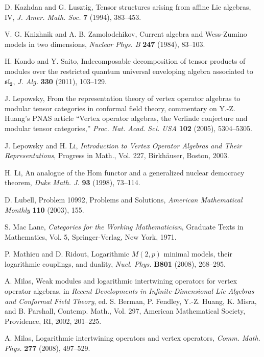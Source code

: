 \documentclass[12pt]{article}
\begin{document}
\begin{thebibliography}{FGST2}
D. Kazhdan and G. Lusztig,
Tensor structures arising {from} affine Lie algebras, IV,
{\em J. Amer. Math. Soc.} {\bf 7} (1994), 383--453.

V. G. Knizhnik and A. B. Zamolodchikov,
Current algebra and Wess-Zumino models in two dimensions,
{\em Nuclear Phys. B} {\bf 247} (1984), 83--103.

H. Kondo and Y. Saito, Indecomposable decomposition of tensor products
of modules over the restricted quantum universal enveloping algebra associated
to $\mathbf{\mathfrak{sl}_2}$, {\em J. Alg.} {\bf 330} (2011), 103--129.

 J. Lepowsky, {}From the representation theory of
vertex operator algebras to modular tensor categories in conformal
field theory, commentary on Y.-Z. Huang's PNAS article ``Vertex
operator algebras, the Verlinde conjecture and modular tensor
categories,'' {\it Proc. Nat. Acad. Sci. USA} {\bf 102} (2005),
5304--5305.

J. Lepowsky and H. Li, {\em Introduction to Vertex Operator Algebras
and Their Representations}, Progress in Math., Vol. 227, Birkh\"auser,
Boston, 2003.

H. Li, An analogue of the Hom functor and a generalized
nuclear democracy theorem, {\em Duke Math. J.} {\bf 93} (1998), 73--114.

 D. Lubell, Problem 10992, Problems and Solutions,
{\em American Mathematical Monthly} {\bf 110} (2003), 155.

 S. Mac Lane, {\it Categories for the Working
Mathematician}, Graduate Texts in Mathematics, Vol. 5,
Springer-Verlag, New York, 1971.

P. Mathieu and D. Ridout, Logarithmic $M(2,p)$ minimal models, their
logarithmic couplings, and duality, {\em Nucl. Phys.} {\bf B801}
(2008), 268--295.

 A. Milas, Weak modules and logarithmic intertwining
operators for vertex operator algebras, in {\em Recent Developments in
Infinite-Dimensional Lie Algebras and Conformal Field Theory},
ed. S. Berman, P. Fendley, Y.-Z. Huang, K. Misra, and B. Parshall,
Contemp. Math., Vol. 297, American Mathematical Society, Providence,
RI, 2002, 201--225.

 A. Milas, Logarithmic intertwining operators 
and vertex operators,  {\it Comm. Math. Phys.} {\bf 277} (2008), 497--529.


\end{thebibliography}
\end{document}
